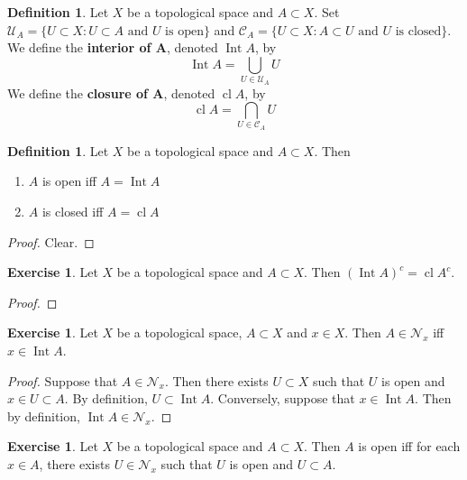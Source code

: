 \documentclass[12pt]{amsart}
\theoremstyle{definition}
\newtheorem{defn}[definition]{Definition}
\newtheorem{ex}[definition]{Exercise}
\newcommand{\MC}{\mathcal{C}}
\newcommand{\MN}{\mathcal{N}}
\newcommand{\MU}{\mathcal{U}}
\newcommand{\tbf}[1]{\textbf{#1}}
\DeclareMathOperator{\cl}{cl}
\DeclareMathOperator{\Int}{Int}
\DeclareMathOperator*{\0}{\mbf{0}}
\DeclareMathOperator*{\1}{\mbf{1}}
\newcommand{\lex}[1]{\label{ex:#1}}
\newcommand{\ld}[1]{\label{defn:#1}}
\begin{document}
	\begin{defn} \ld{31013}
	Let $X$ be a topological space and $A \subset X$. Set $\MU_{A} = \{U \subset X:U \subset A \text{ and $U$ is open}\}$ and $\MC_{A} = \{U \subset X: A \subset U \text{ and $U$ is closed}\}$. \\
	We define the \tbf{interior of A}, denoted $\Int A$, by $$\Int A = \bigcup_{U \in \MU_{A}} U$$ 
	We define the \tbf{closure of A}, denoted $\cl A$, by $$\cl A = \bigcap_{U \in \MC_{A}} U$$ 
	\end{defn}
	
	\begin{defn} \ld{31014}
	Let $X$ be a topological space and $A \subset X$. Then 
	\begin{enumerate}
	\item $A$ is open iff $A = \Int A$ 
	\item $A$ is closed iff $A = \cl A$
	\end{enumerate}
	\end{defn}
	
	\begin{proof}
	Clear.
	\end{proof}
	
	\begin{ex} \lex{31015}
	Let $X$ be a topological space and $A \subset X$. Then $( \Int A )^c = \cl A^c $.
	\end{ex}	
	
	\begin{proof}
	
	\end{proof}
	
	
	\begin{ex} \lex{31016}
	Let $X$ be a topological space, $A \subset X$ and $x \in X$. Then $A \in \MN_x$ iff $x \in \Int A$.
	\end{ex}
	
	\begin{proof}
	Suppose that $A \in \MN_x$. Then there exists $U \subset X$ such that $U$ is open and $x \in U \subset A$. By definition, $U \subset \Int A$. Conversely, suppose that $x \in \Int A$. Then by definition, $\Int A \in \MN_x$.
	\end{proof}
	
	\begin{ex} \lex{31017}
	Let $X$ be a topological space and $A \subset X$. Then $A$ is open iff for each $x \in A$, there exists $U \in \MN_x$ such that $U$ is open and $U \subset A$.
	\end{ex}
	
\end{document}
